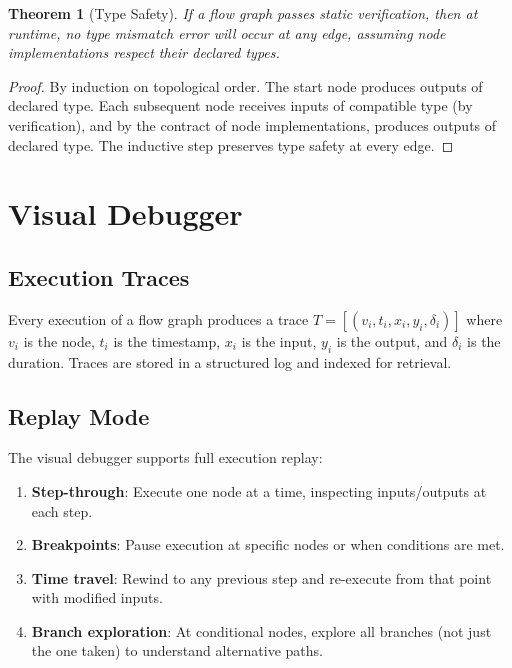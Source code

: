 \documentclass[11pt,twocolumn]{article}
\newtheorem{theorem}{Theorem}
\begin{document}
\begin{theorem}[Type Safety]
If a flow graph passes static verification, then at runtime, no type mismatch error will occur at any edge, assuming node implementations respect their declared types.
\end{theorem}

\begin{proof}
By induction on topological order. The start node produces outputs of declared type. Each subsequent node receives inputs of compatible type (by verification), and by the contract of node implementations, produces outputs of declared type. The inductive step preserves type safety at every edge.
\end{proof}

\section{Visual Debugger}
\label{sec:debugger}

\subsection{Execution Traces}

Every execution of a flow graph produces a trace $T = [(v_i, t_i, x_i, y_i, \delta_i)]$ where $v_i$ is the node, $t_i$ is the timestamp, $x_i$ is the input, $y_i$ is the output, and $\delta_i$ is the duration. Traces are stored in a structured log and indexed for retrieval.

\subsection{Replay Mode}

The visual debugger supports full execution replay:

\begin{enumerate}[leftmargin=1.4em]
    \item \textbf{Step-through}: Execute one node at a time, inspecting inputs/outputs at each step.
    \item \textbf{Breakpoints}: Pause execution at specific nodes or when conditions are met.
    \item \textbf{Time travel}: Rewind to any previous step and re-execute from that point with modified inputs.
    \item \textbf{Branch exploration}: At conditional nodes, explore all branches (not just the one taken) to understand alternative paths.
\end{enumerate}
\end{document}
